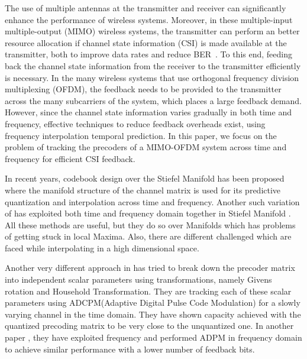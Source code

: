\documentclass[conference]{IEEEtran}
\begin{document}
The use of multiple antennas at the transmitter and receiver can significantly enhance the performance of wireless systems. Moreover, in these multiple-input multiple-output (MIMO) wireless systems, the transmitter can perform an better resource allocation if channel state information (CSI) is made available at the transmitter, both to improve data rates and reduce BER~\cite{love2008overview}. To this end, feeding back the channel state information from the receiver to the transmitter efficiently is necessary. In the many wireless systems that use orthogonal frequency division multiplexing (OFDM), the feedback needs to be provided to the transmitter across the many subcarriers of the system, which places a large feedback demand. However, since the channel state information varies gradually in both time and frequency, effective techniques to reduce feedback overheads exist, using frequency interpolation temporal prediction. In this paper, we focus on the problem of tracking the precoders of a MIMO-OFDM system across time and frequency for efficient CSI feedback.

In recent years, codebook design over the Stiefel Manifold \cite{6891198} has been proposed where the manifold structure of the channel matrix is used for its predictive quantization and interpolation across time and frequency. Another such variation of \cite{6891198} has exploited both time and frequency domain together in Stiefel Manifold \cite{Gupt1905:Predictive}. All these methods are useful, but they do so over Manifolds which has problems of getting stuck in local Maxima. Also, there are different challenged which are faced while interpolating in a high dimensional space.

Another very different approach in \cite{4114278} has tried to break down the precoder matrix into independent scalar parameters using transformations, namely Givens rotation and Household Transformation. They are tracking each of these scalar parameters using ADCPM(Adaptive Digital Pulse Code Modulation) for a slowly varying channel in the time domain. They have shown capacity achieved with the quantized precoding matrix to be very close to the unquantized one. In another paper \cite{4556174}, they have exploited frequency and performed ADPM in frequency domain to achieve similar performance with a lower number of feedback bits.
\end{document}
